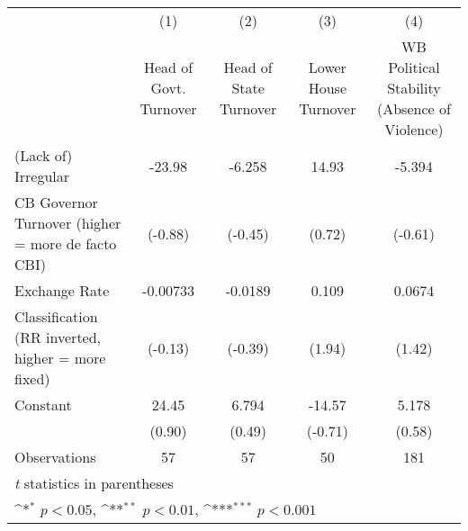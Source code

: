 {
\def\sym#1{\ifmmode^{#1}\else\(^{#1}\)\fi}
\begin{tabular}{l*{4}{c}}
\hline\hline
                    &\multicolumn{1}{c}{(1)}&\multicolumn{1}{c}{(2)}&\multicolumn{1}{c}{(3)}&\multicolumn{1}{c}{(4)}\\
                    &\multicolumn{1}{c}{Head of Govt. Turnover}&\multicolumn{1}{c}{Head of State Turnover}&\multicolumn{1}{c}{Lower House Turnover}&\multicolumn{1}{c}{WB Political Stability (Absence of Violence)}\\
\hline
(Lack of) Irregular &      -23.98         &      -6.258         &       14.93         &      -5.394         \\
CB Governor Turnover (higher = more de facto CBI)&     (-0.88)         &     (-0.45)         &      (0.72)         &     (-0.61)         \\
[1em]
Exchange Rate       &    -0.00733         &     -0.0189         &       0.109         &      0.0674         \\
Classification (RR inverted, higher = more fixed)&     (-0.13)         &     (-0.39)         &      (1.94)         &      (1.42)         \\
[1em]
Constant            &       24.45         &       6.794         &      -14.57         &       5.178         \\
                    &      (0.90)         &      (0.49)         &     (-0.71)         &      (0.58)         \\
\hline
Observations        &          57         &          57         &          50         &         181         \\
\hline\hline
\multicolumn{5}{l}{\footnotesize \textit{t} statistics in parentheses}\\
\multicolumn{5}{l}{\footnotesize \sym{*} \(p<0.05\), \sym{**} \(p<0.01\), \sym{***} \(p<0.001\)}\\
\end{tabular}
}

